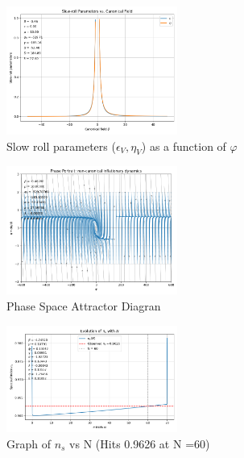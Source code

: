 \documentclass[aps,prd,reprint,preprintnumbers,showpacs,floatfix,nofootinbib,superscript address]{revtex4-2}
\begin{document}
\begin{figure}[h!]
    \centering
    \includegraphics[width=0.5\textwidth]{Python/Figures/Full Slow Roll Parameters.png}
    \caption{Slow roll parameters ($\epsilon_V , \eta_V$) as a function of $\varphi$}
    \label{Slow Roll Parameters}
\end{figure}

\begin{figure}[h!]
    \centering
    \includegraphics[width=0.5\textwidth]{Python/Figures/Phase Space 1.png}
    \caption{Phase Space Attractor Diagran}
    \label{Phase Space}
\end{figure}

\begin{figure}[h!]
    \centering
    \includegraphics[width=0.5\textwidth]{Python/Figures/Ns graph.png}
    \caption{Graph of $n_s$ vs N (Hits 0.9626 at N =60)}
    \label{n_s}
\end{figure}
\end{document}
